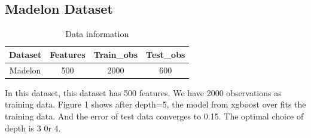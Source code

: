 \documentclass[a4paper]{article}
\begin{document}
\subsection{Madelon Dataset}
\begin{table}[H]
\centering
\caption{Data information}
\begin{tabular}{|c|c|c|c|}
	\hline
	Dataset & Features &\textbf{Train\_obs} & \textbf{Test\_obs}\\
	\hline
    Madelon & 500 & 2000 & 600\\
	\hline
\end{tabular}
\end{table}
In this dataset, this dataset has 500 features. We have 2000 observations as training data. Figure 1 shows after depth=5, the model from xgboost over fits the training data. And the error of test data converges to 0.15. The optimal choice of depth is 3 0r 4.
\end{document}
